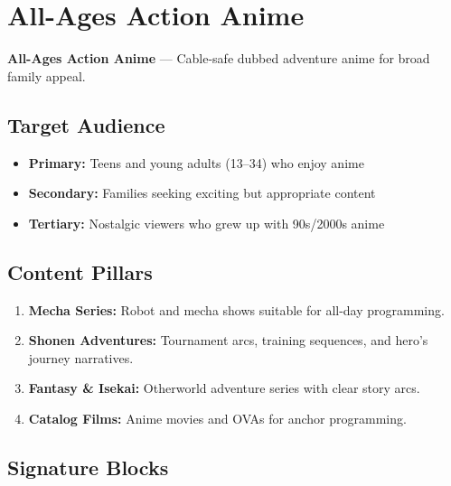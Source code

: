 \documentclass[12pt,letterpaper,twoside]{report}
\begin{document}
\section{All-Ages Action Anime}
\label{sec:anime}

\begin{channelbox}[animeblue]
\textbf{All-Ages Action Anime} --- Cable-safe dubbed adventure anime for broad family appeal.
\end{channelbox}

\subsection{Target Audience}

\begin{itemize}[leftmargin=1.5cm]
    \item \textbf{Primary:} Teens and young adults (13--34) who enjoy anime
    \item \textbf{Secondary:} Families seeking exciting but appropriate content
    \item \textbf{Tertiary:} Nostalgic viewers who grew up with 90s/2000s anime
\end{itemize}

\subsection{Content Pillars}

\begin{enumerate}[leftmargin=2cm]
    \item \textbf{Mecha Series:} Robot and mecha shows suitable for all-day programming.
    \item \textbf{Shonen Adventures:} Tournament arcs, training sequences, and hero's journey narratives.
    \item \textbf{Fantasy \& Isekai:} Otherworld adventure series with clear story arcs.
    \item \textbf{Catalog Films:} Anime movies and OVAs for anchor programming.
\end{enumerate}

\subsection{Signature Blocks}
\end{document}
